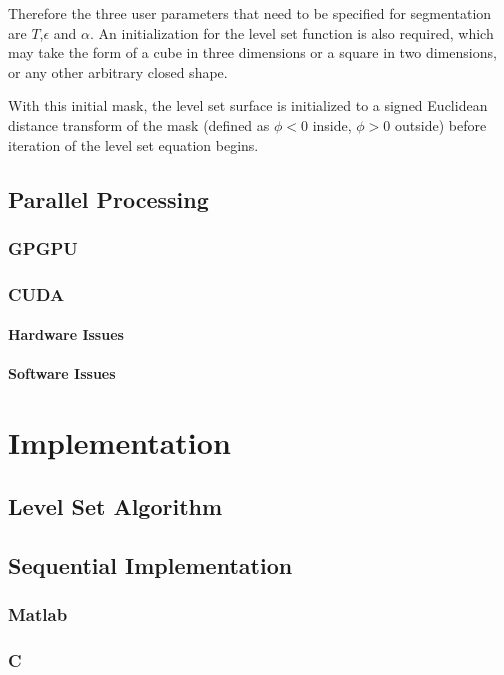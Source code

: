 \documentclass{report}
\begin{document}
Therefore the three user parameters that need to be specified for segmentation are $T$,$\epsilon$ and $\alpha$. An initialization for the level set function is also required, which may take the form of a cube in three dimensions or a square in two dimensions, or any other arbitrary closed shape. 


With this initial mask, the level set surface is initialized to a signed Euclidean distance transform of the mask (defined as $\phi<0$ inside, $\phi>0$ outside) before iteration of the level set equation begins.


	\section{Parallel Processing}
		\subsection{GPGPU}
		\subsection{CUDA}
			\subsubsection{Hardware Issues}
			\subsubsection{Software Issues}

\chapter{Implementation}

	\section{Level Set Algorithm}

	\section{Sequential Implementation}
		\subsection{Matlab}
		\subsection{C}
\end{document}

